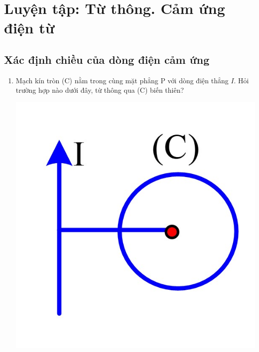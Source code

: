\chapter{Luyện tập: Từ thông. Cảm ứng điện từ}
\section{Xác định chiều của dòng điện cảm ứng}
\begin{enumerate}
	\item
	{
		Mạch kín tròn (C) nằm trong cùng mặt phẳng P với dòng điện thẳng $I$. Hỏi trường hợp nào dưới đây, từ thông qua (C) biến thiên?
		\begin{center}
			\includegraphics[scale=0.2]{../figs/VN11-PH-29-P-0191-1}
		\end{center}
}
\end{enumerate}
